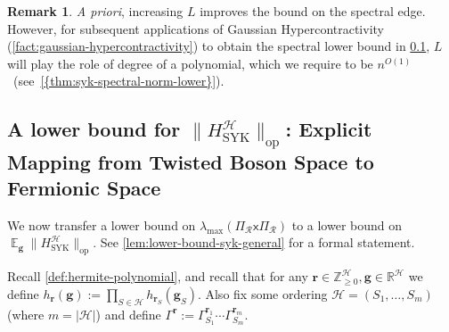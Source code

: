 \documentclass
[11pt,letterpaper]
{article}
\theoremstyle{definition}
\newtheorem{remark}[theorem]{Remark}
\newcommand{\op}{\operatorname{op}}
\newcommand{\sfx}{\mathsf x}
\newcommand{\R}{{\mathbb R}}
\newcommand{\1}{\mathbf{1}}
\newcommand{\Z}{\mathbb Z}
\newcommand{\cH}{\mathcal H}
\DeclareMathOperator*{\E}{\mathbb{E}}
\newcommand{\cR}{\mathcal R}
\renewcommand{\geq}{\geqslant}
\begin{document}
\begin{remark}
    \emph{A priori}, increasing $L$ improves the bound on the spectral edge. However, for subsequent applications of Gaussian Hypercontractivity (\cref{fact:gaussian-hypercontractivity}) to obtain the spectral lower bound in \cref{subsec:lowerbound}, $L$ will play the role of degree of a polynomial, which we require to be $n^{O(1)}$~(see~\cref{{thm:syk-spectral-norm-lower}}).
\end{remark}

\subsection{A lower bound for $\|H^{\cH}_{\operatorname{SYK}}\|_{\op}$: Explicit Mapping from Twisted Boson Space to Fermionic Space} \label{subsec:lowerbound}

We now transfer a lower bound on $\lambda_{\max}(\Pi_\cR\sfx\Pi_\cR)$ to a lower bound on $\E_{\bm g}\|H^{\cH}_{\operatorname{SYK}}\|_{\op}$. See \cref{lem:lower-bound-syk-general} for a formal statement.


Recall \cref{def:hermite-polynomial}, and recall that for any $\bm r\in\Z_{\geq 0}^\cH, \bm g\in\R^\cH$ we define $h_{\bm r}(\bm g):= \prod_{S\in\cH}h_{\bm r_S}(\bm g_S)$. Also fix some ordering $\cH = (S_1, \ldots, S_m)$ (where $m = |\cH|$) and define $\Gamma^{\bm r}:= \Gamma_{S_1}^{\bm r_1}\cdots\Gamma_{S_m}^{\bm r_m}$.
\end{document}
